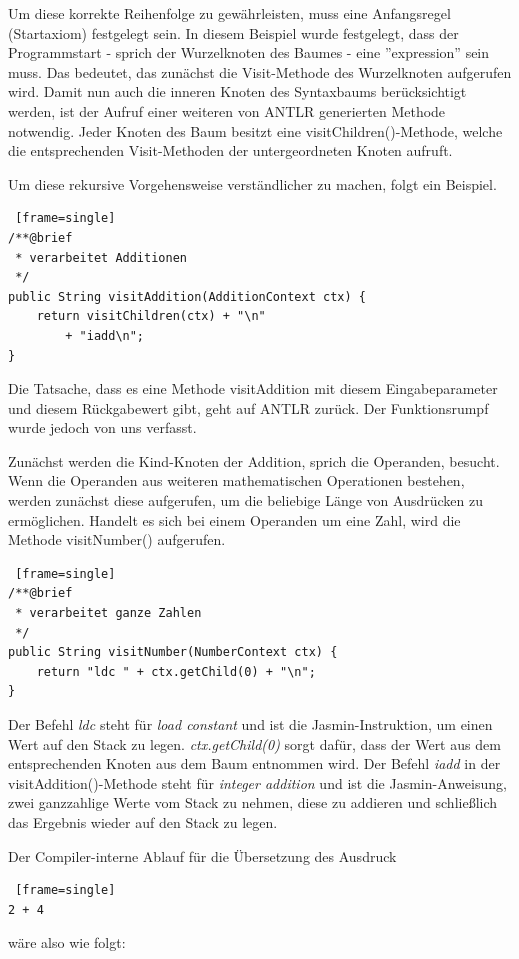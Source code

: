 Um diese korrekte Reihenfolge zu gewährleisten, muss eine Anfangsregel (Startaxiom) festgelegt sein. In diesem Beispiel wurde festgelegt, dass der Programmstart - sprich der Wurzelknoten des Baumes - eine ''expression'' sein muss. Das bedeutet, das zunächst die Visit-Methode des Wurzelknoten aufgerufen wird. Damit nun auch die inneren Knoten des Syntaxbaums berücksichtigt werden, ist der Aufruf einer weiteren von ANTLR generierten Methode notwendig. Jeder Knoten des Baum besitzt eine visitChildren()-Methode, welche die entsprechenden Visit-Methoden der untergeordneten Knoten aufruft.

\pagebreak
Um diese rekursive Vorgehensweise verständlicher zu machen, folgt ein Beispiel.


\begin{lstlisting} [frame=single]
/**@brief
 * verarbeitet Additionen
 */
public String visitAddition(AdditionContext ctx) {
	return visitChildren(ctx) + "\n"
		+ "iadd\n";
}
\end{lstlisting}


Die Tatsache, dass es eine Methode visitAddition mit diesem Eingabeparameter und diesem Rückgabewert gibt, geht auf ANTLR zurück. Der Funktionsrumpf wurde jedoch von uns verfasst.

Zunächst werden die Kind-Knoten der Addition, sprich die Operanden, besucht. Wenn die Operanden aus weiteren mathematischen Operationen bestehen, werden zunächst diese aufgerufen, um die beliebige Länge von Ausdrücken zu ermöglichen. Handelt es sich bei einem Operanden um eine Zahl, wird die Methode visitNumber() aufgerufen.

\begin{lstlisting} [frame=single]
/**@brief
 * verarbeitet ganze Zahlen
 */
public String visitNumber(NumberContext ctx) {
	return "ldc " + ctx.getChild(0) + "\n";
}
\end{lstlisting}

Der Befehl \textit{ldc} steht für \textit{load constant} und ist die Jasmin-Instruktion, um einen Wert auf den Stack zu legen. \textit{ctx.getChild(0)} sorgt dafür, dass der Wert aus dem entsprechenden Knoten aus dem Baum entnommen wird.
Der Befehl \textit{iadd} in der visitAddition()-Methode steht für \textit{integer addition} und ist die Jasmin-Anweisung, zwei ganzzahlige Werte vom Stack zu nehmen, diese zu addieren und schließlich das Ergebnis wieder auf den Stack zu legen.

Der Compiler-interne Ablauf für die Übersetzung des Ausdruck 
\begin{lstlisting} [frame=single]
2 + 4
\end{lstlisting}
wäre also wie folgt: \\

